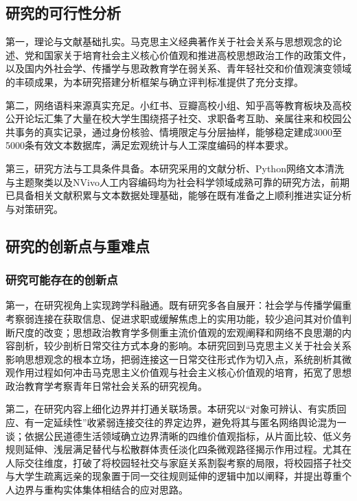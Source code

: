 \subsection{研究的可行性分析}

第一，理论与文献基础扎实。马克思主义经典著作关于社会关系与思想观念的论述、党和国家关于培育社会主义核心价值观和推进高校思想政治工作的政策文件，以及国内外社会学、传播学与思政教育学在弱关系、青年轻社交和价值观演变领域的丰硕成果，为本研究搭建分析框架与确立评判标准提供了充分支撑。

第二，网络语料来源真实充足。小红书、豆瓣高校小组、知乎高等教育板块及高校公开论坛汇集了大量在校大学生围绕搭子社交、求职备考互助、亲属往来和校园公共事务的真实记录，通过身份核验、情境限定与分层抽样，能够稳定建成3000至5000条有效文本数据库，满足宏观统计与人工深度编码的样本要求。

第三，研究方法与工具条件具备。本研究采用的文献分析、Python网络文本清洗与主题聚类以及NVivo人工内容编码均为社会科学领域成熟可靠的研究方法，前期已具备相关文献积累与文本数据处理基础，能够在既有准备之上顺利推进实证分析与对策研究。

\subsection{研究的创新点与重难点}

\subsubsection{研究可能存在的创新点}

第一，在研究视角上实现跨学科融通。既有研究多各自展开：社会学与传播学偏重考察弱连接在获取信息、促进求职或缓解焦虑上的实用功能，较少追问其对价值判断尺度的改变；思想政治教育学多侧重主流价值观的宏观阐释和网络不良思潮的内容剖析，较少剖析日常交往方式本身的影响。本研究回到马克思主义关于社会关系影响思想观念的根本立场，把弱连接这一日常交往形式作为切入点，系统剖析其微观作用过程如何冲击马克思主义价值观与社会主义核心价值观的培育，拓宽了思想政治教育学考察青年日常社会关系的研究视角。

第二，在研究内容上细化边界并打通关联场景。本研究以“对象可辨认、有实质回应、有一定延续性”收紧弱连接交往的界定边界，避免将其与匿名网络舆论混为一谈；依据公民道德生活领域确立边界清晰的四维价值观指标，从片面比较、低义务规则延伸、浅层满足替代与松散群体责任淡化四条微观路径揭示作用过程。尤其在人际交往维度，打破了将校园轻社交与家庭关系割裂考察的局限，将校园搭子社交与大学生疏离远亲的现象置于同一交往规则延伸的逻辑中加以阐释，并提出尊重个人边界与重构实体集体相结合的应对思路。

